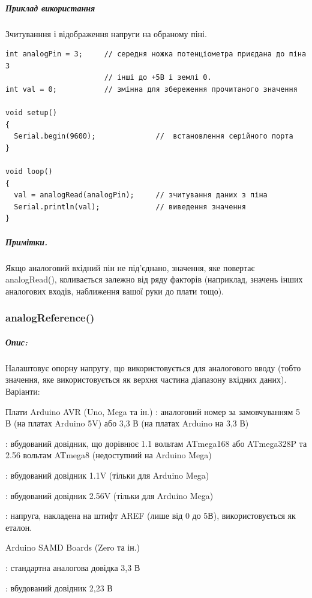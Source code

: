 \documentclass[12pt,a4paper]{report}  %
\begin{document}
\subparagraph{Приклад використання}

Зчитуванння і відображення напруги на обраному піні.
\begin{lstlisting}[label=digitalwrite,caption=Використання функції digitalWrite()]
int analogPin = 3;     // середня ножка потенціометра приєдана до піна 3
                       // інші до +5В і землі 0.
int val = 0;           // змінна для збереження прочитаного значення

void setup()
{
  Serial.begin(9600);              //  встановлення серійного порта
}

void loop()
{
  val = analogRead(analogPin);     // зчитування даних з піна
  Serial.println(val);             // виведення значення
}
\end{lstlisting}

\subparagraph{Примітки.}

Якщо аналоговий вхідний пін не під'єднано, значення, яке повертає analogRead(), коливається залежно від ряду факторів (наприклад, значень інших аналогових входів, наближення вашої руки до плати тощо).

\subsubsection{analogReference()}\label{analogReference}

\subparagraph{Опис:} Налаштовує опорну напругу, що використовується для аналогового вводу (тобто значення, яке використовується як верхня частина діапазону вхідних даних). Варіанти:

Плати Arduino AVR (Uno, Mega та ін.)
    : аналоговий номер за замовчуванням 5 В (на платах Arduino 5V) або 3,3 В (на платах Arduino на 3,3 В)

    : вбудований довідник, що дорівнює 1.1 вольтам ATmega168 або ATmega328P та 2.56 вольтам ATmega8 (недоступний на Arduino Mega)

    : вбудований довідник 1.1V (тільки для Arduino Mega)

    : вбудований довідник 2.56V (тільки для Arduino Mega)

    : напруга, накладена на штифт AREF (лише від 0 до 5В), використовується як еталон.

Arduino SAMD Boards (Zero та ін.)

    : стандартна аналогова довідка 3,3 В

    : вбудований довідник 2,23 В
\end{document}
